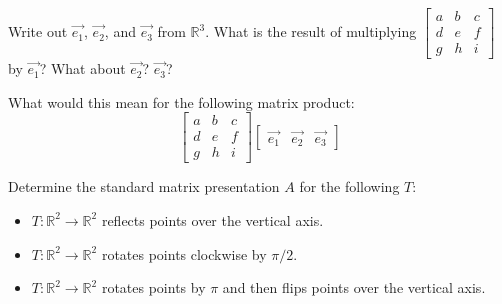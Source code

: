 \bq
Write out $\vec{e_1}$, $\vec{e_2}$, and $\vec{e_3}$ from $\mathbb{R}^3$. What is the result of multiplying $\begin{bmatrix} a&b&c\\d&e&f\\g&h&i \end{bmatrix}$ by $\vec{e_1}$? What about $\vec{e_2}$? $\vec{e_3}$?

What would this mean for the following matrix product: $$\begin{bmatrix} a&b&c\\d&e&f\\g&h&i \end{bmatrix} \begin{bmatrix} \vec{e_1}&\vec{e_2}&\vec{e_3} \end{bmatrix}$$
\eq

\bq Determine the standard matrix presentation $A$ for the following $T$:
\begin{itemize}
\item $T: \mathbb{R}^2 \to \mathbb{R}^2$ reflects points over the vertical axis.
\item $T: \mathbb{R}^2 \to \mathbb{R}^2$ rotates points clockwise by $\pi/2$.
\item $T: \mathbb{R}^2 \to \mathbb{R}^2$ rotates points by $\pi$ and then flips points over the vertical axis.
\end{itemize}
\eq


